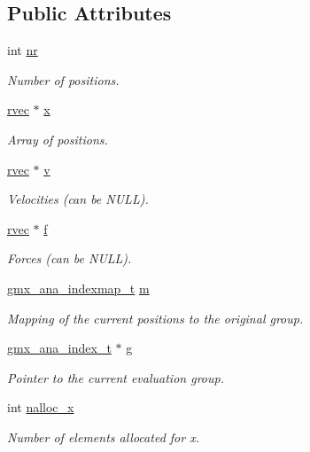\subsection*{\-Public \-Attributes}
\begin{DoxyCompactItemize}
\item 
int \hyperlink{structgmx__ana__pos__t_a97807eb00cb8f19c40985dba69550029}{nr}
\begin{DoxyCompactList}\small\item\em \-Number of positions. \end{DoxyCompactList}\item 
\hyperlink{share_2template_2gromacs_2types_2simple_8h_aa02a552a4abd2f180c282a083dc3a999}{rvec} $\ast$ \hyperlink{structgmx__ana__pos__t_acbb8fe97fa65a1020d3c40af55c7a690}{x}
\begin{DoxyCompactList}\small\item\em \-Array of positions. \end{DoxyCompactList}\item 
\hyperlink{share_2template_2gromacs_2types_2simple_8h_aa02a552a4abd2f180c282a083dc3a999}{rvec} $\ast$ \hyperlink{structgmx__ana__pos__t_ad8dabea9b34f51e95d4f1d3fee6b3306}{v}
\begin{DoxyCompactList}\small\item\em \-Velocities (can be \-N\-U\-L\-L). \end{DoxyCompactList}\item 
\hyperlink{share_2template_2gromacs_2types_2simple_8h_aa02a552a4abd2f180c282a083dc3a999}{rvec} $\ast$ \hyperlink{structgmx__ana__pos__t_a3e337b4e370615fef4e55395496ffada}{f}
\begin{DoxyCompactList}\small\item\em \-Forces (can be \-N\-U\-L\-L). \end{DoxyCompactList}\item 
\hyperlink{structgmx__ana__indexmap__t}{gmx\-\_\-ana\-\_\-indexmap\-\_\-t} \hyperlink{structgmx__ana__pos__t_a7e0c3f28330c1336b49b9992a9885e20}{m}
\begin{DoxyCompactList}\small\item\em \-Mapping of the current positions to the original group. \end{DoxyCompactList}\item 
\hyperlink{structgmx__ana__index__t}{gmx\-\_\-ana\-\_\-index\-\_\-t} $\ast$ \hyperlink{structgmx__ana__pos__t_ab12af55e452332476dd74fa28e52e2b6}{g}
\begin{DoxyCompactList}\small\item\em \-Pointer to the current evaluation group. \end{DoxyCompactList}\item 
int \hyperlink{structgmx__ana__pos__t_aed78236d047849d2d5f5363310512282}{nalloc\-\_\-x}
\begin{DoxyCompactList}\small\item\em \-Number of elements allocated for {\ttfamily x}. \end{DoxyCompactList}\end{DoxyCompactItemize}


